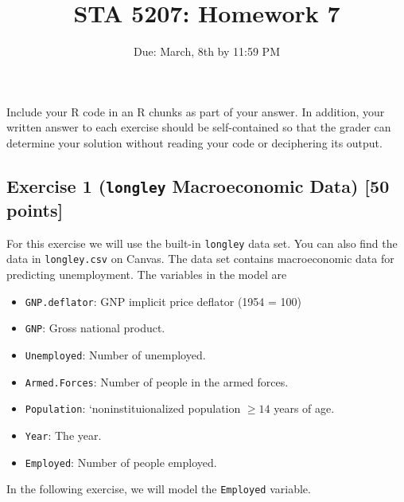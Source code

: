 \documentclass[
]{article}
\title{STA 5207: Homework 7}
\author{}
\date{\vspace{-2.5em}Due: March, 8th by 11:59 PM}
\providecommand{\tightlist}{%
  \setlength{\itemsep}{0pt}\setlength{\parskip}{0pt}}
\begin{document}
\maketitle

Include your R code in an R chunks as part of your answer. In addition,
your written answer to each exercise should be self-contained so that
the grader can determine your solution without reading your code or
deciphering its output.

\hypertarget{exercise-1-longley-macroeconomic-data-50-points}{%
\subsection{\texorpdfstring{Exercise 1 (\texttt{longley} Macroeconomic
Data) {[}50
points{]}}{Exercise 1 (longley Macroeconomic Data) {[}50 points{]}}}\label{exercise-1-longley-macroeconomic-data-50-points}}

For this exercise we will use the built-in \texttt{longley} data set.
You can also find the data in \texttt{longley.csv} on Canvas. The data
set contains macroeconomic data for predicting unemployment. The
variables in the model are

\begin{itemize}
\tightlist
\item
  \texttt{GNP.deflator}: GNP implicit price deflator (1954 = 100)
\item
  \texttt{GNP}: Gross national product.
\item
  \texttt{Unemployed}: Number of unemployed.
\item
  \texttt{Armed.Forces}: Number of people in the armed forces.
\item
  \texttt{Population}: `noninstituionalized population \(\geq 14\) years
  of age.
\item
  \texttt{Year}: The year.
\item
  \texttt{Employed}: Number of people employed.
\end{itemize}

In the following exercise, we will model the \texttt{Employed} variable.
\end{document}
